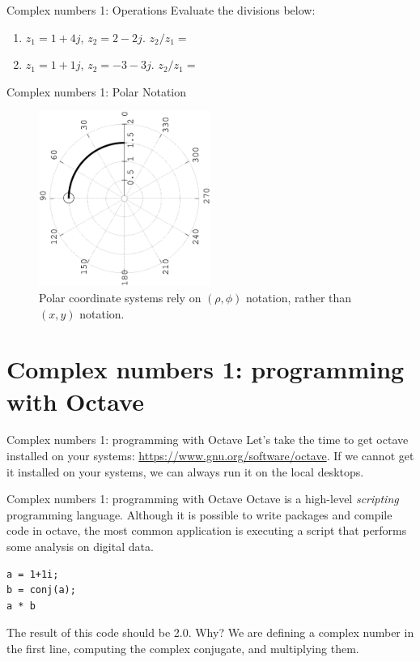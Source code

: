 \documentclass{beamer}
\begin{document}
\begin{frame}{Complex numbers 1: Operations}
Evaluate the divisions below:
\begin{enumerate}
\item $z_1 = 1+4j$, $z_2 = 2-2j$.  $z_2/z_1 = $
\item $z_1 = 1+1j$, $z_2 = -3-3j$.  $z_2/z_1 = $
\end{enumerate}
\end{frame}

\begin{frame}{Complex numbers 1: Polar Notation}
\begin{figure}
\centering
\includegraphics[width=0.5\textwidth,angle=270,trim=4cm 2cm 0cm 0cm]{figures/polar.eps}
\caption{\label{fig:complex3} Polar coordinate systems rely on $(\rho,\phi)$ notation, rather than $(x,y)$ notation.}
\end{figure}
\end{frame}

\section{Complex numbers 1: programming with Octave}

\begin{frame}{Complex numbers 1: programming with Octave}
Let's take the time to get octave installed on your systems: \url{https://www.gnu.org/software/octave}.  If we cannot get it installed on your systems, we can always run it on the local desktops.
\end{frame}

\begin{frame}[fragile]{Complex numbers 1: programming with Octave}
Octave is a high-level \textit{scripting} programming language.  Although it is possible to write packages and compile code in octave, the most common application is executing a script that performs some analysis on digital data. \\
\begin{verbatim}
a = 1+1i;
b = conj(a);
a * b
\end{verbatim}
The result of this code should be 2.0.  Why?  We are defining a complex number in the first line, computing the complex conjugate, and multiplying them.
\end{frame}
\end{document}
